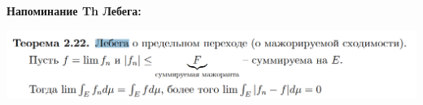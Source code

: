 \begin{properties}
\begin{enumerate}
{            \textbf{Напоминание Th Лебега:}\newline

            \begin{center}
                \includegraphics[scale=0.7]{./assets/03-characteristic-funcs/lebegs-theorem.PNG}
            \end{center}


        }
    \end{enumerate}
\end{properties}

